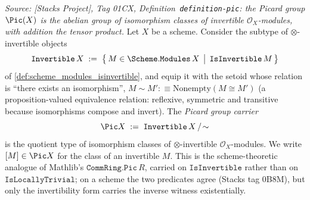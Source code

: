\begin{definition}


  \label{def:pic_carrier}
  \textit{Source: [Stacks Project], Tag 01CX, Definition~\texttt{definition-pic}:
  the Picard group \(\Pic(X)\) is the abelian group of isomorphism classes of
  invertible \(\mathcal{O}_X\)-modules, with addition the tensor product.}
  Let \(X\) be a scheme. Consider the subtype of \(\otimes\)-invertible objects
  \[
    \mathtt{Invertible}\,X
    \;:=\;
    \bigl\{\, M \in \Scheme.\mathtt{Modules}\,X
              \,\bigm|\, \mathtt{IsInvertible}\,M \,\bigr\}
  \]
  of \cref{def:scheme_modules_isinvertible}, and equip it with the setoid whose
  relation is ``there exists an isomorphism'',
  \(M \sim M' :\equiv \mathrm{Nonempty}(M \cong M')\) (a proposition-valued
  equivalence relation: reflexive, symmetric and transitive because isomorphisms
  compose and invert). The \emph{Picard group carrier}
  \[
    \Pic X \;:=\; \mathtt{Invertible}\,X \,/\!\sim
  \]
  is the quotient type of isomorphism classes of \(\otimes\)-invertible
  \(\mathcal{O}_X\)-modules. We write \([M] \in \Pic X\) for the class of an
  invertible \(M\). This is the scheme-theoretic analogue of Mathlib's
  \(\mathtt{CommRing.Pic}\,R\), carried on \(\mathtt{IsInvertible}\) rather than on
  \(\mathtt{IsLocallyTrivial}\); on a scheme the two predicates agree (Stacks tag
  0B8M), but only the invertibility form carries the inverse witness existentially.
\end{definition}

